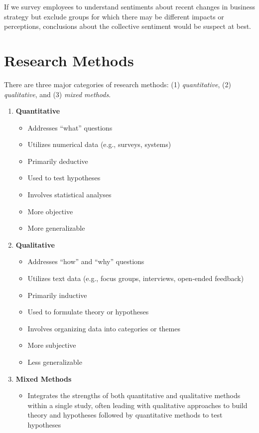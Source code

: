 \documentclass[
]{book}
\providecommand{\tightlist}{%
  \setlength{\itemsep}{0pt}\setlength{\parskip}{0pt}}
\begin{document}
If we survey employees to understand sentiments about recent changes in business strategy but exclude groups for which there may be different impacts or perceptions, conclusions about the collective sentiment would be suspect at best.

\hypertarget{research-methods}{%
\section{Research Methods}\label{research-methods}}

There are three major categories of research methods: (1) \emph{quantitative}, (2) \emph{qualitative}, and (3) \emph{mixed methods}.

\begin{enumerate}
\def\labelenumi{\arabic{enumi}.}
\tightlist
\item
  \textbf{Quantitative}

  \begin{itemize}
  \tightlist
  \item
    Addresses ``what'' questions
  \item
    Utilizes numerical data (e.g., surveys, systems)
  \item
    Primarily deductive
  \item
    Used to test hypotheses
  \item
    Involves statistical analyses
  \item
    More objective
  \item
    More generalizable
  \end{itemize}
\item
  \textbf{Qualitative}

  \begin{itemize}
  \tightlist
  \item
    Addresses ``how'' and ``why'' questions
  \item
    Utilizes text data (e.g., focus groups, interviews, open-ended feedback)
  \item
    Primarily inductive
  \item
    Used to formulate theory or hypotheses
  \item
    Involves organizing data into categories or themes
  \item
    More subjective
  \item
    Less generalizable
  \end{itemize}
\item
  \textbf{Mixed Methods}

  \begin{itemize}
  \tightlist
  \item
    Integrates the strengths of both quantitative and qualitative methods within a single study, often leading with qualitative approaches to build theory and hypotheses followed by quantitative methods to test hypotheses
  \end{itemize}
\end{enumerate}
\end{document}
